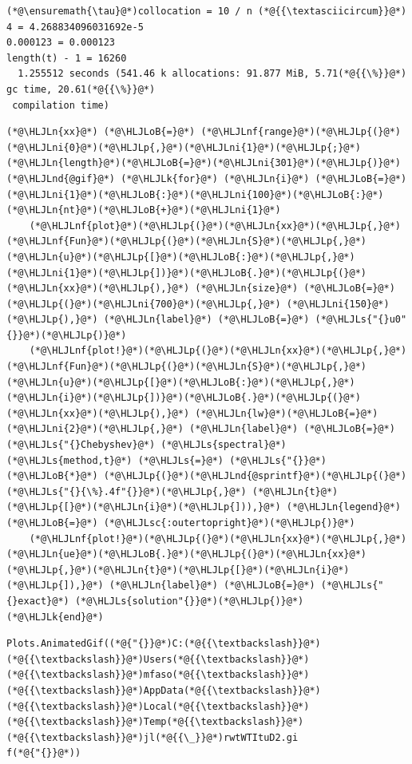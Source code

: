 \documentclass[12pt,a4paper]{article}
\newcommand{\HLJLk}[1]{\textcolor[RGB]{148,91,176}{\textbf{#1}}}
\newcommand{\HLJLn}[1]{#1}
\newcommand{\HLJLnd}[1]{\textcolor[RGB]{214,102,97}{#1}}
\newcommand{\HLJLnf}[1]{\textcolor[RGB]{66,102,213}{#1}}
\newcommand{\HLJLs}[1]{\textcolor[RGB]{201,61,57}{#1}}
\newcommand{\HLJLsc}[1]{\textcolor[RGB]{201,61,57}{#1}}
\newcommand{\HLJLni}[1]{\textcolor[RGB]{59,151,46}{#1}}
\newcommand{\HLJLoB}[1]{\textcolor[RGB]{102,102,102}{\textbf{#1}}}
\newcommand{\HLJLp}[1]{#1}
\begin{document}
\begin{lstlisting}
(*@\ensuremath{\tau}@*)collocation = 10 / n (*@{{\textasciicircum}}@*) 4 = 4.268834096031692e-5
0.000123 = 0.000123
length(t) - 1 = 16260
  1.255512 seconds (541.46 k allocations: 91.877 MiB, 5.71(*@{{\%}}@*) gc time, 20.61(*@{{\%}}@*)
 compilation time)
\end{lstlisting}


\begin{lstlisting}
(*@\HLJLn{xx}@*) (*@\HLJLoB{=}@*) (*@\HLJLnf{range}@*)(*@\HLJLp{(}@*)(*@\HLJLni{0}@*)(*@\HLJLp{,}@*)(*@\HLJLni{1}@*)(*@\HLJLp{;}@*)(*@\HLJLn{length}@*)(*@\HLJLoB{=}@*)(*@\HLJLni{301}@*)(*@\HLJLp{)}@*)
(*@\HLJLnd{@gif}@*) (*@\HLJLk{for}@*) (*@\HLJLn{i}@*) (*@\HLJLoB{=}@*) (*@\HLJLni{1}@*)(*@\HLJLoB{:}@*)(*@\HLJLni{100}@*)(*@\HLJLoB{:}@*)(*@\HLJLn{nt}@*)(*@\HLJLoB{+}@*)(*@\HLJLni{1}@*)
    (*@\HLJLnf{plot}@*)(*@\HLJLp{(}@*)(*@\HLJLn{xx}@*)(*@\HLJLp{,}@*) (*@\HLJLnf{Fun}@*)(*@\HLJLp{(}@*)(*@\HLJLn{S}@*)(*@\HLJLp{,}@*)(*@\HLJLn{u}@*)(*@\HLJLp{[}@*)(*@\HLJLoB{:}@*)(*@\HLJLp{,}@*)(*@\HLJLni{1}@*)(*@\HLJLp{])}@*)(*@\HLJLoB{.}@*)(*@\HLJLp{(}@*)(*@\HLJLn{xx}@*)(*@\HLJLp{),}@*) (*@\HLJLn{size}@*) (*@\HLJLoB{=}@*) (*@\HLJLp{(}@*)(*@\HLJLni{700}@*)(*@\HLJLp{,}@*) (*@\HLJLni{150}@*)(*@\HLJLp{),}@*) (*@\HLJLn{label}@*) (*@\HLJLoB{=}@*) (*@\HLJLs{"{}u0"{}}@*)(*@\HLJLp{)}@*)
    (*@\HLJLnf{plot!}@*)(*@\HLJLp{(}@*)(*@\HLJLn{xx}@*)(*@\HLJLp{,}@*) (*@\HLJLnf{Fun}@*)(*@\HLJLp{(}@*)(*@\HLJLn{S}@*)(*@\HLJLp{,}@*)(*@\HLJLn{u}@*)(*@\HLJLp{[}@*)(*@\HLJLoB{:}@*)(*@\HLJLp{,}@*)(*@\HLJLn{i}@*)(*@\HLJLp{])}@*)(*@\HLJLoB{.}@*)(*@\HLJLp{(}@*)(*@\HLJLn{xx}@*)(*@\HLJLp{),}@*) (*@\HLJLn{lw}@*)(*@\HLJLoB{=}@*)(*@\HLJLni{2}@*)(*@\HLJLp{,}@*) (*@\HLJLn{label}@*) (*@\HLJLoB{=}@*) (*@\HLJLs{"{}Chebyshev}@*) (*@\HLJLs{spectral}@*) (*@\HLJLs{method,t}@*) (*@\HLJLs{=}@*) (*@\HLJLs{"{}}@*) (*@\HLJLoB{*}@*) (*@\HLJLp{(}@*)(*@\HLJLnd{@sprintf}@*)(*@\HLJLp{(}@*)(*@\HLJLs{"{}{\%}.4f"{}}@*)(*@\HLJLp{,}@*) (*@\HLJLn{t}@*)(*@\HLJLp{[}@*)(*@\HLJLn{i}@*)(*@\HLJLp{])),}@*) (*@\HLJLn{legend}@*) (*@\HLJLoB{=}@*) (*@\HLJLsc{:outertopright}@*)(*@\HLJLp{)}@*)
    (*@\HLJLnf{plot!}@*)(*@\HLJLp{(}@*)(*@\HLJLn{xx}@*)(*@\HLJLp{,}@*) (*@\HLJLn{ue}@*)(*@\HLJLoB{.}@*)(*@\HLJLp{(}@*)(*@\HLJLn{xx}@*)(*@\HLJLp{,}@*)(*@\HLJLn{t}@*)(*@\HLJLp{[}@*)(*@\HLJLn{i}@*)(*@\HLJLp{]),}@*) (*@\HLJLn{label}@*) (*@\HLJLoB{=}@*) (*@\HLJLs{"{}exact}@*) (*@\HLJLs{solution"{}}@*)(*@\HLJLp{)}@*)
(*@\HLJLk{end}@*)
\end{lstlisting}

\begin{lstlisting}
Plots.AnimatedGif((*@{"{}}@*)C:(*@{{\textbackslash}}@*)(*@{{\textbackslash}}@*)Users(*@{{\textbackslash}}@*)(*@{{\textbackslash}}@*)mfaso(*@{{\textbackslash}}@*)(*@{{\textbackslash}}@*)AppData(*@{{\textbackslash}}@*)(*@{{\textbackslash}}@*)Local(*@{{\textbackslash}}@*)(*@{{\textbackslash}}@*)Temp(*@{{\textbackslash}}@*)(*@{{\textbackslash}}@*)jl(*@{{\_}}@*)rwtWTItuD2.gi
f(*@{"{}}@*))
\end{lstlisting}
\end{document}
